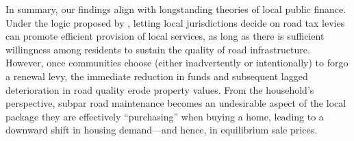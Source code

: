
In summary, our findings align with longstanding theories of local public finance. Under the logic proposed by \cite{Oates1972}, letting local jurisdictions decide on road tax levies can promote efficient provision of local services, as long as there is sufficient willingness among residents to sustain the quality of road infrastructure. However, once communities choose (either inadvertently or intentionally) to forgo a renewal levy, the immediate reduction in funds and subsequent lagged deterioration in road quality erode property values. From the household’s perspective, subpar road maintenance becomes an undesirable aspect of the local package they are effectively “purchasing” when buying a home, leading to a downward shift in housing demand—and hence, in equilibrium sale prices.





